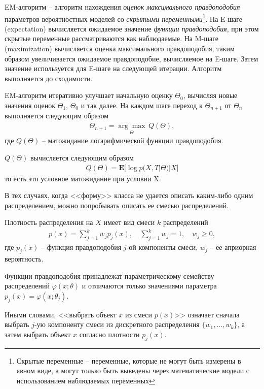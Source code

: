 \documentclass[%
	11pt,
	a4paper,
	utf8,
		]{article}
\begin{document}
EM-алгоритм -- алгоритм нахождения \emph{оценок максимального правдоподобия} параметров вероятностных моделей со \emph{скрытыми переменными}\footnote{Скрытые переменные -- переменные, которые не могут быть измерены в явном виде, а могут только быть выведены через математические модели с использованием наблюдаемых переменных}. На E-шаге (expectation) вычисляется ожидаемое значение \emph{функции правдоподобия}, при этом скрытые переменные рассматриваются как наблюдаемые. На M-шаге (maximization) вычисляется оценка максимального правдоподобия, таким образом увеличивается ожидаемое правдоподобие, вычисляемое на E-шаге. Затем значение используется для E-шаге на следующей итерации. Алгоритм выполняется до сходимости.

EM-алгоритм итеративно улучшает начальную оценку $ \Theta_0 $, вычисляя новые значения оценок $ \Theta_1 $, $ \Theta_0 $ и так далее. На каждом шаге переход к $ \Theta_{n + 1} $ от $ \Theta_n $ выполняется следующим образом
\begin{align*}
	\Theta_{n + 1} = \underset{\Theta}{\arg \max}\, Q(\Theta),
\end{align*}
где $ Q(\Theta) $ -- матожидание логарифмической функции правдоподобия.

$ Q(\Theta) $ вычисляется следующим образом
\begin{align*}
	Q(\Theta) = \mathbf{E} \big[ \log p(X, T | \Theta) | X \big]
\end{align*}
то есть это условное матожидание при условии X.


В тех случаях, когда <<форму>> класса не удается описать каким-либо одним распределением, можно попробывать описать ее смесью распределений.

Плотность распределения на $ X $ имеет вид смеси $ k $ распределений
\begin{align*}
	p(x) = \sum_{j=1}^{k} w_j p_j(x), \quad \sum_{j=1}^{k} w_j = 1, \quad w_j \geqslant 0,
\end{align*}
где $ p_j(x) $ -- функция правдоподобия $ j $-ой компоненты смеси, $ w_j $ -- ее априорная вероятность.

Функции правдоподобия принадлежат параметрическому семейству распределений $ \varphi(x; \theta) $ и отличаются только значениями параметра $ p_j(x) = \varphi(x; \theta_j) $.

Иными словами, <<выбрать объект $ x $ из смеси $ p(x) $>> означает сначала выбрать $ j $-ую компоненту смеси из дискретного распределения $ \{w_1, \ldots, w_k\} $, а затем выбрать объект $ x $ согласно плотности $ p_j(x) $.
\end{document}
